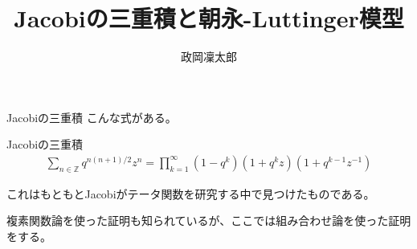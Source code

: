\documentclass[9pt, dvipdfmx]{beamer}
\numberwithin{equation}{section}
\begin{document}
\begin{frame}{}
    \title{Jacobiの三重積と朝永-Luttinger模型}
    \author{政岡凜太郎}
    \titlepage
\end{frame}
\begin{frame}{Jacobiの三重積}
    こんな式がある。
    \begin{block}{Jacobiの三重積}
        \begin{align}
            \sum_{n\in \mathbb{Z}} q^{n(n+1)/2}z^n
            = \prod_{k=1}^{\infty}
                (1-q^{k})(1+q^{k}z)(1+q^{k-1}z^{-1})
        \end{align}
    \end{block}
    これはもともとJacobiがテータ関数を研究する中で見つけたものである。

    複素関数論を使った証明も知られているが、ここでは組み合わせ論を使った証明をする。
\end{frame}



\end{document}
